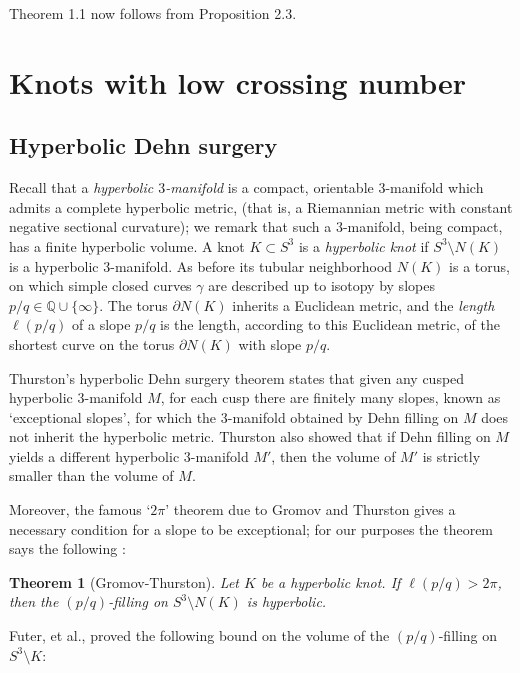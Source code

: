 \documentclass[11pt,usenames,dvipsnames,reqno]{amsart}
\newtheorem{theorem}{Theorem}
\numberwithin{theorem}{section}
\theoremstyle{ex}
\theoremstyle{rem}
\begin{document}
Theorem 1.1 now follows from Proposition 2.3.

\section{Knots with low crossing number}

\subsection{Hyperbolic Dehn surgery}

Recall that a \textit{hyperbolic $3$-manifold} is a compact, orientable $3$-manifold which admits a complete hyperbolic metric, (that is, a Riemannian metric with constant negative sectional curvature); we remark that such a $3$-manifold, being compact, has a finite hyperbolic volume. A knot $K\subset S^3$ is a \textit{hyperbolic knot} if $S^3\setminus N(K)$ is a hyperbolic $3$-manifold. As before its tubular neighborhood $N(K)$ is a torus, on which simple closed curves $\gamma$ are described up to isotopy by slopes $p/q\in\mathbb{Q}\cup\{\infty\}$. The torus $\partial N(K)$ inherits a Euclidean metric, and the \textit{length} $\ell(p/q)$ of a slope $p/q$ is the length, according to this Euclidean metric, of the shortest curve on the torus $\partial N(K)$ with slope $p/q$.

Thurston's hyperbolic Dehn surgery theorem \cite[\S5.8]{thurston-notes} states that given any cusped hyperbolic $3$-manifold $M$, for each cusp there are finitely many slopes, known as `exceptional slopes', for which the $3$-manifold obtained by Dehn filling on $M$ does not inherit the hyperbolic metric. Thurston also showed \cite[p.~268]{benedetti-petronio} that if Dehn filling on $M$ yields a different hyperbolic $3$-manifold $M'$, then the volume of $M'$ is strictly smaller than the volume of $M$.

Moreover, the famous `$2\pi$' theorem due to Gromov and Thurston gives a necessary condition for a slope to be exceptional; for our purposes the theorem says the following \cite{cooper-lackenby}:

\begin{theorem}[Gromov-Thurston]\label{GromovThurston}
Let $K$ be a hyperbolic knot. If $\ell(p/q)>2\pi$, then the $(p/q)$-filling on $S^3\setminus N(K)$ is hyperbolic.
\end{theorem}

Futer, et al., \cite{futer} proved the following bound on the volume of the $(p/q)$-filling on $S^3\setminus K$:
\end{document}
